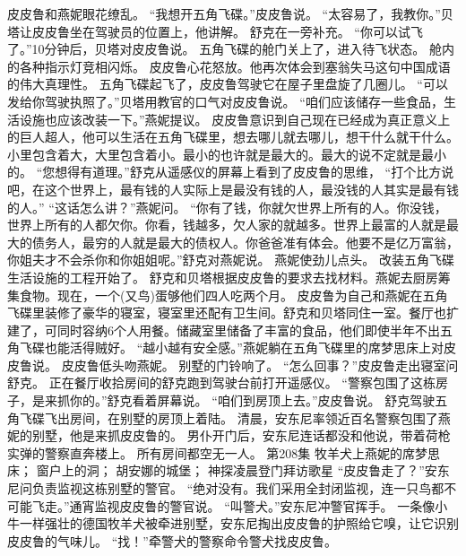 \documentclass[a4paper,12pt,UTF8,twoside]{ctexbook}
\begin{document}
        皮皮鲁和燕妮眼花缭乱。  
        “我想开五角飞碟。”皮皮鲁说。  
        “太容易了，我教你。”贝塔让皮皮鲁坐在驾驶员的位置上，他讲解。  
        舒克在一旁补充。  
        “你可以试飞了。”10分钟后，贝塔对皮皮鲁说。  
        五角飞碟的舱门关上了，进入待飞状态。  
        舱内的各种指示灯竞相闪烁。  
        皮皮鲁心花怒放。他再次体会到塞翁失马这句中国成语的伟大真理性。  
        五角飞碟起飞了，皮皮鲁驾驶它在屋子里盘旋了几圈儿。  
        “可以发给你驾驶执照了。”贝塔用教官的口气对皮皮鲁说。  
        “咱们应该储存一些食品，生活设施也应该改装一下。”燕妮提议。  
        皮皮鲁意识到自己现在已经成为真正意义上的巨人超人，他可以生活在五角飞碟里，想去哪儿就去哪儿，想干什么就干什么。小里包含着大，大里包含着小。最小的也许就是最大的。最大的说不定就是最小的。  
        “您想得有道理。”舒克从遥感仪的屏幕上看到了皮皮鲁的思维，  “打个比方说吧，在这个世界上，最有钱的人实际上是最没有钱的人，最没钱的人其实是最有钱的人。”  
        “这话怎么讲？”燕妮问。  
        “你有了钱，你就欠世界上所有的人。你没钱，世界上所有的人都欠你。你看，钱越多，欠人家的就越多。世界上最富的人就是最大的债务人，最穷的人就是最大的债权人。你爸爸准有体会。他要不是亿万富翁，你姐夫才不会杀你和你姐姐呢。”舒克对燕妮说。  
        燕妮使劲儿点头。  
        改装五角飞碟生活设施的工程开始了。  
        舒克和贝塔根据皮皮鲁的要求去找材料。燕妮去厨房筹集食物。现在，一个(又鸟)蛋够他们四人吃两个月。        
        皮皮鲁为自己和燕妮在五角飞碟里装修了豪华的寝室，寝室里还配有卫生间。舒克和贝塔同住一室。餐厅也扩建了，可同时容纳6个人用餐。储藏室里储备了丰富的食品，他们即使半年不出五角飞碟也能活得贼好。  
        “越小越有安全感。”燕妮躺在五角飞碟里的席梦思床上对皮皮鲁说。  
        皮皮鲁低头吻燕妮。  
        别墅的门铃响了。  
        “怎么回事？”皮皮鲁走出寝室问舒克。  
        正在餐厅收拾房间的舒克跑到驾驶台前打开遥感仪。  
        “警察包围了这栋房子，是来抓你的。”舒克看着屏幕说。  
        “咱们到房顶上去。”皮皮鲁说。  
        舒克驾驶五角飞碟飞出房间，在别墅的房顶上着陆。  
        清晨，安东尼率领近百名警察包围了燕妮的别墅，他是来抓皮皮鲁的。  
        男仆开门后，安东尼连话都没和他说，带着荷枪实弹的警察直奔楼上。  
        所有房间都空无一人。          第208集  
        牧羊犬上燕妮的席梦思床；  
        窗户上的洞；  
        胡安娜的城堡；  
        神探凌晨登门拜访歌星    
        “皮皮鲁走了？”安东尼问负责监视这栋别墅的警官。  
        “绝对没有。我们采用全封闭监视，连一只鸟都不可能飞走。”通宵监视皮皮鲁的警官说。  
        “叫警犬。”安东尼冲警官挥手。  
        一条像小牛一样强壮的德国牧羊犬被牵进别墅，安东尼掏出皮皮鲁的护照给它嗅，让它识别皮皮鲁的气味儿。  
        “找！”牵警犬的警察命令警犬找皮皮鲁。  
\end{document}
